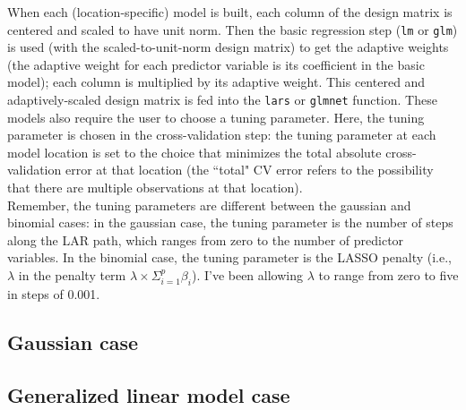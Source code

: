 \documentclass[10pt]{amsart}
\begin{document}
When each (location-specific) model is built, each column of the design matrix is centered and scaled to have unit norm. Then the basic regression step (\verb!lm! or \verb!glm!) is used (with the scaled-to-unit-norm design matrix) to get the adaptive weights (the adaptive weight for each predictor variable is its coefficient in the basic model); each column is multiplied by its adaptive weight. This centered and adaptively-scaled design matrix is fed into the \verb!lars! or \verb!glmnet! function. These models also require the user to choose a tuning parameter. Here, the tuning parameter is chosen in the cross-validation step: the tuning parameter at each model location is set to the choice that minimizes the total absolute cross-validation error at that location (the ``total" CV error refers to the possibility that there are multiple observations at that location).\\

Remember, the tuning parameters are different between the gaussian and binomial cases: in the gaussian case, the tuning parameter is the number of steps along the LAR path, which ranges from zero to the number of predictor variables. In the binomial case, the tuning parameter is the LASSO penalty (i.e., $\lambda$ in the penalty term $\lambda \times \Sigma_{i=1}^p\beta_i$). I've been allowing $\lambda$ to range from zero to five in steps of 0.001.\\

\subsection{Gaussian case}


\subsection{Generalized linear model case}



\end{document}
